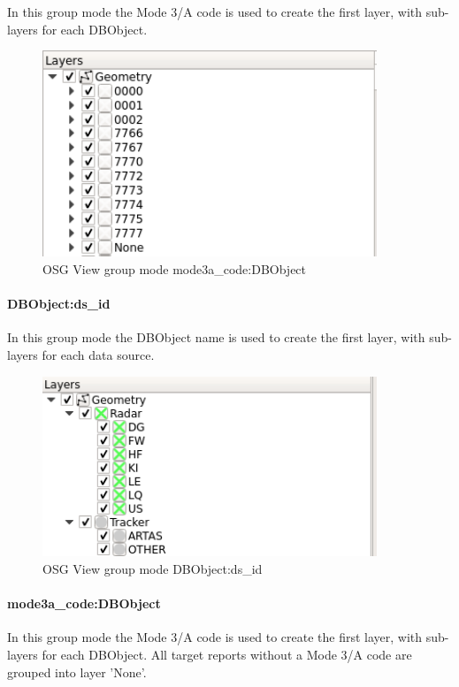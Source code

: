 {In this group mode the Mode 3/A code is used to create the first layer, with sub-layers for each DBObject.

\begin{figure}[H]
    \includegraphics[width=10cm,frame]{../screenshots/osgview_group_ma_dbo.png}
  \caption{OSG View group mode mode3a\_code:DBObject}
\end{figure}

\paragraph{DBObject:ds\_id}

In this group mode the DBObject name is used to create the first layer, with sub-layers for each data source.

\begin{figure}[H]
    \includegraphics[width=10cm,frame]{../screenshots/osgview_group_dbo_ds.png}
  \caption{OSG View group mode DBObject:ds\_id}
\end{figure}

\paragraph{mode3a\_code:DBObject}

In this group mode the Mode 3/A code is used to create the first layer, with sub-layers for each DBObject. All target reports without a Mode 3/A code are grouped into layer 'None'.

}
